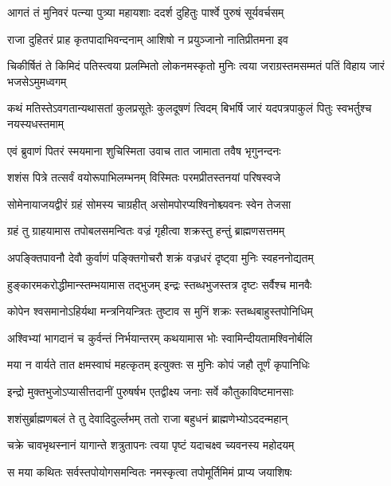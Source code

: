 \twolineshloka
{आगतं तं मुनिवरं पत्न्या पुत्र्या महायशाः}
{ददर्श दुहितुः पार्श्वे पुरुषं सूर्यवर्चसम्}%

\twolineshloka
{राजा दुहितरं प्राह कृतपादाभिवन्दनाम्}
{आशिषो न प्रयुञ्जानो नातिप्रीतमना इव}%

\fourlineindentedshloka
{चिकीर्षितं ते किमिदं पतिस्त्वया}
{प्रलम्भितो लोकनमस्कृतो मुनिः}
{त्वया जराग्रस्तमसम्मतं पतिं}
{विहाय जारं भजसेऽमुमध्वगम्}%

\twolineshloka
{कथं मतिस्तेऽवगतान्यथासतां कुलप्रसूतेः कुलदूषणं त्विदम्}
{बिभर्षि जारं यदपत्रपाकुलं पितुः स्वभर्तुश्च नयस्यधस्तमाम्}%

\twolineshloka
{एवं ब्रुवाणं पितरं स्मयमाना शुचिस्मिता}
{उवाच तात जामाता तवैष भृगुनन्दनः}%

\twolineshloka
{शशंस पित्रे तत्सर्वं वयोरूपाभिलम्भनम्}
{विस्मितः परमप्रीतस्तनयां परिषस्वजे}%

\twolineshloka
{सोमेनायाजयद्वीरं ग्रहं सोमस्य चाग्रहीत्}
{असोमपोरप्यश्विनोश्च्यवनः स्वेन तेजसा}%

\twolineshloka
{ग्रहं तु ग्राहयामास तपोबलसमन्वितः}
{वज्रं गृहीत्वा शक्रस्तु हन्तुं ब्राह्मणसत्तमम्}%

\twolineshloka
{अपङ्क्तिपावनौ देवौ कुर्वाणं पङ्क्तिगोचरौ}
{शक्रं वज्रधरं दृष्ट्वा मुनिः स्वहननोद्यतम्}%

\twolineshloka
{हुङ्कारमकरोद्धीमान्स्तम्भयामास तद्भुजम्}
{इन्द्रः स्तब्धभुजस्तत्र दृष्टः सर्वैश्च मानवैः}%

\twolineshloka
{कोपेन श्वसमानोऽहिर्यथा मन्त्रनियन्त्रितः}
{तुष्टाव स मुनिं शक्रः स्तब्धबाहुस्तपोनिधिम्}%

\twolineshloka
{अश्विभ्यां भागदानं च कुर्वन्तं निर्भयान्तरम्}
{कथयामास भोः स्वामिन्दीयतामश्विनोर्बलि}%

\twolineshloka
{मया न वार्यते तात क्षमस्वाघं महत्कृतम्}
{इत्युक्तः स मुनिः कोपं जहौ तूर्णं कृपानिधिः}%

\twolineshloka
{इन्द्रो मुक्तभुजोऽप्यासीत्तदानीं पुरुषर्षभ}
{एतद्वीक्ष्य जनाः सर्वे कौतुकाविष्टमानसाः}%

\twolineshloka
{शशंसुर्ब्राह्मणबलं ते तु देवादिदुर्ल्लभम्}
{ततो राजा बहुधनं ब्राह्मणेभ्योऽददन्महान्}%

\twolineshloka
{चक्रे चावभृथस्नानं यागान्ते शत्रुतापनः}
{त्वया पृष्टं यदाचक्ष्व च्यवनस्य महोदयम्}%

\twolineshloka
{स मया कथितः सर्वस्तपोयोगसमन्वितः}
{नमस्कृत्वा तपोमूर्तिमिमं प्राप्य जयाशिषः}%


